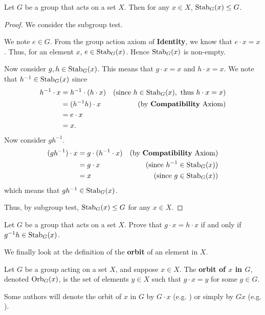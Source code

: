 \begin{lemma}\label{lemma-stabilizer-is-subgroup}
    Let $G$ be a group that acts on a set $X$. Then for any $x \in X$, $\mathrm{Stab}_{G}(x) \leq G$.
\end{lemma}
\begin{proof}
    We consider the subgroup test.

    We note $e \in G$. From the group action axiom of \textbf{Identity}, we know that $e \cdot x = x$. Thus, for an element $x$, $e \in \mathrm{Stab}_{G}(x)$. Hence $\mathrm{Stab}_{G}(x)$ is non-empty.

    Now consider $g, h \in \mathrm{Stab}_{G}(x)$. This means that $g\cdot x = x$ and $h \cdot x = x$. We note that $h^{-1} \in \mathrm{Stab}_{G}(x)$ since
    \begin{align*}
        h^{-1} \cdot x &= h^{-1} \cdot (h \cdot x) & (\text{since } h \in \mathrm{Stab}_{G}(x), \text{ thus } h\cdot x = x)\\
        &= (h^{-1}h) \cdot x & (\text{by \textbf{Compatibility} Axiom})\\
        &= e \cdot x\\
        &= x.
    \end{align*}
    Now consider $gh^{-1}$.
    \begin{align*}
        (gh^{-1}) \cdot x &= g \cdot (h^{-1} \cdot x) & (\text{by \textbf{Compatibility} Axiom})\\
        &= g \cdot x & (\text{since } h^{-1} \in \mathrm{Stab}_{G}(x))\\
        &= x & (\text{since } g \in \mathrm{Stab}_{G}(x))
    \end{align*}
    which means that $gh^{-1} \in \mathrm{Stab}_{G}(x)$.

    Thus, by subgroup test, $\mathrm{Stab}_{G}(x) \leq G$ for any $x \in X$.
\end{proof}

\begin{exercise}\label{exercise-group-action-equivalence}
    Let $G$ be a group that acts on a set $X$. Prove that $g \cdot x = h \cdot x$ if and only if $g^{-1}h \in \mathrm{Stab}_{G}(x)$.
\end{exercise}

We finally look at the definition of the \textbf{orbit} of an element in $X$.
\begin{definition}
    Let $G$ be a group acting on a set $X$, and suppose $x \in X$. The \textbf{orbit of $x$ in $G$}, denoted $\mathrm{Orb}_{G}(x)$, is the set of elements $y \in X$ such that $g \cdot x = y$ for some $g \in G$.
\end{definition}
\begin{remark}
    Some authors will denote the orbit of $x$ in $G$ by $G \cdot x$ (e.g. \cite{clark_1984}) or simply by $Gx$ (e.g. \cite{milne_2021}).
\end{remark}

